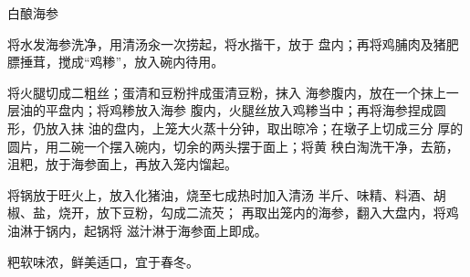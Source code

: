 \begin{recipe}[金钱海参]{白酿海参}

\ingredients


\cooking

\step 将水发海参洗净，用清汤汆一次捞起，将水揩干，放于 盘内；再将鸡脯肉及猪肥膘捶茸，搅成“鸡糁”，放入碗内待用。

\step 将火腿切成二粗丝；蛋清和豆粉拌成蛋清豆粉，抹入 海参腹内，放在一个抹上一层油的平盘内；将鸡糁放入海参 腹内，火腿丝放入鸡糁当中；再将海参捏成圆形，仍放入抹 油的盘内，上笼大火蒸十分钟，取出晾冷；在墩子上切成三分 厚的圆片，用二碗一个摆入碗内，切余的两头摆于面上；将黄 秧白淘洗干净，去筋，沮粑，放于海参面上，再放入笼内馏起。

\step 将锅放于旺火上，放入化猪油，烧至七成热时加入清汤 半斤、味精、料酒、胡椒、盐，烧开，放下豆粉，勾成二流芡； 再取出笼内的海参，翻入大盘内，将鸡油淋于锅内，起锅将 滋汁淋于海参面上即成。

\notes

粑软味浓，鲜美适口，宜于春冬。

\end{recipe}

